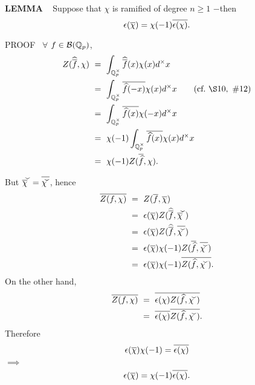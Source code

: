 \vspace{0.1cm}


\begin{x}{\small\bf LEMMA} \ %
Suppose that $\chi$ is ramified of degree $n \ge 1$ $-$then
\[
\epsilon(\overline{\chi}) = \chi(-1) \overline{\epsilon(\chi)}.
\]

\vspace{0.1cm}

PROOF \ 
$\forall$ $f \in \mathcal{B}(\mathbb{Q}_p)$, 
\begin{align*}
Z(\widehat{\ov{f}}, \chi) \ 
&=\   \int_{\Q_p^\times} \widehat{\ov{f}}(x) \chi(x) d^\times x \\		
&=\   \int_{\Q_p^\times} \ov{\widehat{f}(-x)}\chi(x) d^\times x  \qquad (\text{cf.} \ \S 10, \ \#12)\\	
&=\   \int_{\Q_p^\times} \ov{\widehat{f}(x)}\chi(-x) d^\times x \\
&=\   \chi(-1) \int_{\Q_p^\times} \ov{\widehat{f}(x)}\chi(x) d^\times x \\
&=\   \chi(-1) Z(\ov{\widehat{f}}, \chi).
\end{align*}

But $\widecheck{\ov{\chi}} = \ov{\widecheck{\chi}}$, hence
\begin{align*}
\ov{Z(f, \chi)}	\ 
&=\   Z(\ov{f}, \ov{\chi}) \\		
&=\   \epsilon(\ov{\chi}) Z(\widehat{\ov{f}}, \widecheck{\ov{\chi}}) \\	
&=\   \epsilon(\ov{\chi}) Z(\widehat{\ov{f}}, \ov{\widecheck{\chi}}) \\
&=\   \epsilon(\ov{\chi}) \chi(-1) Z(\ov{\widehat{f}}, \ov{\widecheck{\chi}}) \\	
&=\   \epsilon(\ov{\chi}) \chi(-1) \ov{Z(\widehat{f}, \widecheck{\chi})}.	
\end{align*}
On the other hand,
\begin{align*}
\ov{Z({f}, {\chi})} \ 
&=\   \ov{\epsilon(\chi) Z(\widehat{f}, \widecheck{\chi})}\\		
&=\   \ov{\epsilon(\chi)} \ov{Z(\widehat{f}, \widecheck{\chi})}.
\end{align*}
Therefore 
\[
\epsilon(\overline{\chi}) \chi(-1) = \overline{\epsilon(\chi)}
\]
\qquad\qquad\qquad$\implies$
\[
\epsilon(\overline{\chi}) = \chi(-1)\overline{\epsilon(\chi)}.
\]
\end{x}

\vspace{0.1cm}

